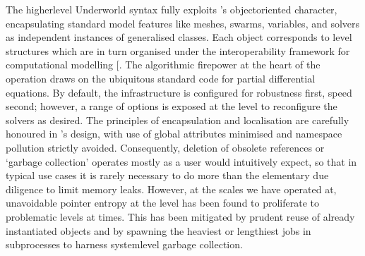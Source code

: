 \documentclass[letterpaper,10pt,english]{jupyterBook}
\begin{document}
\sphinxAtStartPar
The higher\sphinxhyphen{}level Underworld syntax fully exploits ’s object\sphinxhyphen{}oriented character, encapsulating standard model features like meshes, swarms, variables, and solvers as independent instances of generalised classes. Each object corresponds to \sphinxhyphen{}level structures which are in turn organised under the  interoperability framework for computational modelling {[}\sphinxcite{references:id70}{]}. The algorithmic firepower at the heart of the operation draws on the ubiquitous standard  code for partial differential equations. By default, the  infrastructure is configured for robustness first, speed second; however, a range of options is exposed at the  level to reconfigure the solvers as desired. The principles of encapsulation and localisation are carefully honoured in ’s design, with use of global attributes minimised and namespace pollution strictly avoided. Consequently, deletion of obsolete references or ‘garbage collection’ operates mostly as a  user would intuitively expect, so that in typical use cases it is rarely necessary to do more than the elementary due diligence to limit memory leaks. However, at the scales we have operated at, unavoidable pointer entropy at the \sphinxhyphen{}level has been found to proliferate to problematic levels at times. This has been mitigated by prudent reuse of already instantiated objects and by spawning the heaviest or lengthiest jobs in subprocesses to harness system\sphinxhyphen{}level garbage collection.
\end{document}

